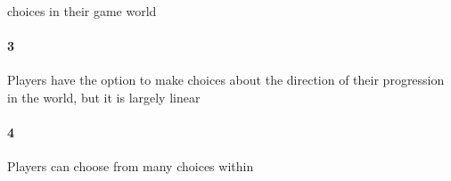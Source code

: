  choices in their game world\paragraph{3}Players have the option to make choices about the direction of their progression in the world, but it is largely linear\paragraph{4}Players can choose from many choices within